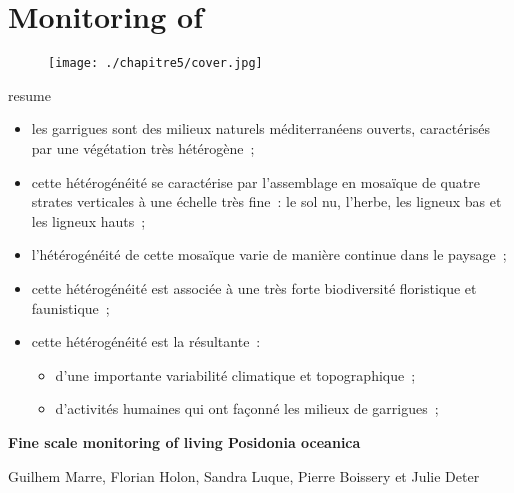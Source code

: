 \chapter{Monitoring of } \label{chapitre5-capferrat}

\pagestyle{main}
\begin{figure}[H] 
	\begin{center}
	\texttt{[image: ./chapitre5/cover.jpg]}
    \end{center}
\end{figure}

\begin{colbox}{resume}
  \vspace{-2pt}
{\color{textresume}\small
\begin{itemize}[leftmargin=0in]\itemsep3pt
\item les garrigues sont des milieux naturels méditerranéens ouverts, caractérisés par une végétation très hétérogène~;
\item cette hétérogénéité se caractérise par l'assemblage en mosaïque de quatre strates verticales à une échelle très fine~: le sol nu, l'herbe, les ligneux bas et les ligneux hauts~;
\item l'hétérogénéité de cette mosaïque varie de manière continue dans le paysage~;
\item cette hétérogénéité est associée à une très forte biodiversité floristique et faunistique~;
\item cette hétérogénéité est la résultante~:
\begin{itemize}
  \item d'une importante variabilité climatique et topographique~;
  \item d'activités humaines qui ont façonné les milieux de garrigues~;
\end{itemize}
\end{itemize}
}
\vspace{-2pt}
\end{colbox}

\clearpage

\noindent\textbf{Fine scale monitoring of living Posidonia oceanica}

\noindent Guilhem Marre, Florian Holon, Sandra Luque, Pierre Boissery et Julie Deter

